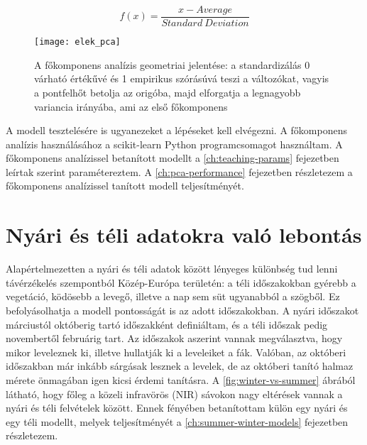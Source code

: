 \begin{equation}\label{eq:standard-scaling}
  f(x) = \frac{x - Average}{Standard \ Deviation}
\end{equation}

\begin{figure}[H]
	\centering
	\texttt{[image: elek\_pca]}
	\caption{A főkomponens analízis geometriai jelentése: a standardizálás 0 várható értékűvé és
  1 empirikus szórásúvá teszi a változókat, vagyis a pontfelhőt betolja az origóba,
  majd elforgatja a legnagyobb variancia irányába, ami az első főkomponens \cite{elek2011}}
    \label{fig:elek-pca}
\end{figure}

A modell tesztelésére is ugyanezeket a lépéseket kell elvégezni. A főkomponens analízis használásához a scikit-learn \cite{scikit-learn} Python programcsomagot használtam. A főkomponens analízissel betanított modellt a \ref{ch:teaching-params} fejezetben leírtak szerint paramétereztem. A \ref{ch:pca-performance} fejezetben részletezem a főkomponens analízissel tanított modell teljesítményét.

\section{Nyári és téli adatokra való lebontás}

Alapértelmezetten a nyári és téli adatok között lényeges különbség tud lenni távérzékelés szempontból Közép-Európa területén: a téli időszakokban gyérebb a vegetáció, ködösebb a levegő, illetve a nap sem süt ugyanabból a szögből. Ez befolyásolhatja a modell pontosságát is az adott időszakokban. A nyári időszakot márciustól októberig tartó időszakként definiáltam, és a téli időszak pedig novembertől februárig tart. Az időszakok aszerint vannak megválasztva, hogy mikor leveleznek ki, illetve hullatják ki a leveleiket a fák. Valóban, az októberi időszakban már inkább sárgásak lesznek a levelek, de az októberi tanító halmaz mérete önmagában igen kicsi érdemi tanításra. A \ref{fig:winter-vs-summer} ábrából látható, hogy főleg a közeli infravörös (NIR) sávokon nagy eltérések vannak a nyári és téli felvételek között. Ennek fényében betanítottam külön egy nyári és egy téli modellt, melyek teljesítményét a \ref{ch:summer-winter-models} fejezetben részletezem.

